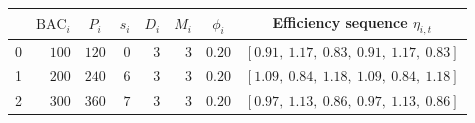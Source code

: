 \footnotesize
\renewcommand{\arraystretch}{1.3}
\setlength{\tabcolsep}{7pt}
\begin{tabularx}{\textwidth}{crrrrrrX}
  \toprule
  \rowcolor{headbg}
  \multicolumn{1}{c}{\color{headfg}\textbf{Project}} &
  \multicolumn{1}{c}{\color{headfg}$\mathrm{BAC}_i$} &
  \multicolumn{1}{c}{\color{headfg}$P_i$} &
  \multicolumn{1}{c}{\color{headfg}$s_i$} &
  \multicolumn{1}{c}{\color{headfg}$D_i$} &
  \multicolumn{1}{c}{\color{headfg}$M_i$} &
  \multicolumn{1}{c}{\color{headfg}$\phi_i$} &
  \multicolumn{1}{c}{\color{headfg}\textbf{Efficiency sequence $\eta_{i,t}$}} \\
  \midrule
  0 & $100$ & $120$ & $0$ & $3$ & $3$ & $0.20$ & $[0.91,\ 1.17,\ 0.83,\ 0.91,\ 1.17,\ 0.83]$ \\
  1 & $200$ & $240$ & $6$ & $3$ & $3$ & $0.20$ & $[1.09,\ 0.84,\ 1.18,\ 1.09,\ 0.84,\ 1.18]$ \\
  2 & $300$ & $360$ & $7$ & $3$ & $3$ & $0.20$ & $[0.97,\ 1.13,\ 0.86,\ 0.97,\ 1.13,\ 0.86]$ \\
  \bottomrule
\end{tabularx}